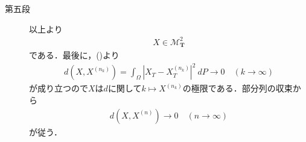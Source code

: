 \begin{sketch}
\begin{description}
 			\item[第五段]
 				以上より
 				\begin{align}
 					X \in \mathscr{M}^2_{\mathbf{T}}
 				\end{align}
 				である．最後に，()より
 				\begin{align}
 					d\left(X,X^{(n_k)}\right) = \int_\Omega \left|X_T-X_T^{(n_k)}\right|^2\ dP
 					\longrightarrow 0\quad (k \longrightarrow \infty)
 				\end{align}
 				が成り立つので$X$は$d$に関して$k \longmapsto X^{(n_k)}$の極限である．部分列の収束から
 				\begin{align}
 					d\left(X,X^{(n)}\right) \longrightarrow 0\quad (n \longrightarrow \infty)
 				\end{align}
 				が従う．
 				\QED
		\end{description}
	\end{sketch}